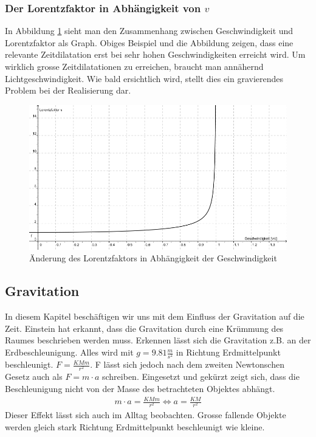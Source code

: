 \begin{refsection}
\subsubsection{Der Lorentzfaktor in Abhängigkeit von $v$}

In Abbildung \ref{skript:zeitreisen:fig:lorentz} sieht man den Zusammenhang zwischen Geschwindigkeit und Lorentzfaktor als Graph. Obiges Beispiel und die Abbildung zeigen, dass eine relevante Zeitdilatation erst bei sehr hohen Geschwindigkeiten erreicht wird. Um wirklich grosse Zeitdilatationen zu erreichen, braucht man annähernd Lichtgeschwindigkeit. Wie bald ersichtlich wird, stellt dies ein gravierendes Problem bei der Realisierung dar.
\begin{figure}[H]
    \centering
    \includegraphics[width=\hsize]{zeitreisen/Lorentzfaktor.jpg}
    \caption{Änderung des Lorentzfaktors in Abh\"angigkeit der Geschwindigkeit}
        \label{skript:zeitreisen:fig:lorentz} 
\end{figure}
\subsection{Gravitation} \label{Gravitation}

	In diesem Kapitel beschäftigen wir uns mit dem Einfluss der Gravitation auf die Zeit. Einstein hat erkannt, dass die Gravitation durch eine Krümmung des Raumes beschrieben werden muss. Erkennen lässt sich die Gravitation z.B. an der Erdbeschleunigung. Alles wird mit $g=9.81\frac{m}{s^2}$ in Richtung Erdmittelpunkt beschleunigt. $F=\frac{KMm}{r^2}$. F lässt sich jedoch nach dem zweiten Newtonschen Gesetz auch als $F=m\cdot a$ schreiben. Eingesetzt und gekürzt zeigt sich, dass die Beschleunigung nicht von der Masse des betrachteten Objektes abhängt.
	\begin{align*}
		m\cdot a = \frac{KMm}{r^2} \Leftrightarrow a=\frac{KM}{r^2} 
	\end{align*}
	Dieser Effekt lässt sich auch im Alltag beobachten. Grosse fallende Objekte werden gleich stark Richtung Erdmittelpunkt beschleunigt wie kleine.
	

\end{refsection}
